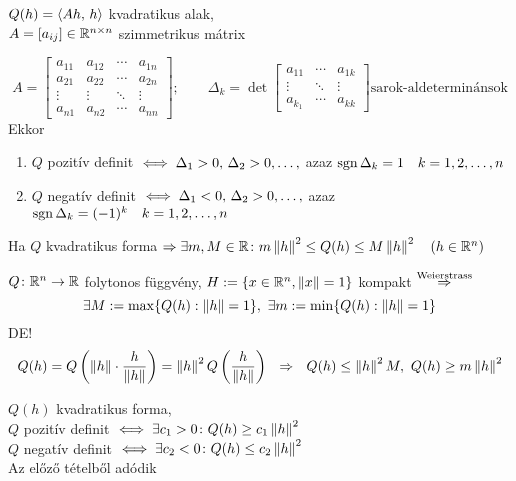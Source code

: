 \begin{te}$Q(h) = \langle Ah,\,h\rangle$ kvadratikus alak,\\$A=[a_{ij}]\in\mathbb{R}^{n\times n}$ szimmetrikus
  mátrix
  
  \[A=\begin{bmatrix}a_{11} & a_{12} & \cdots & a_{1n}\\
  a_{21} & a_{22} & \cdots & a_{2n}\\ \vdots & \vdots & \ddots & \vdots \\
  a_{n1} & a_{n2} & \cdots & a_{nn}\end{bmatrix};\qquad \Delta_k = \det\begin{bmatrix}a_{11}&\cdots&a_{1k}\\
  \vdots &\ddots& \vdots\\a_{k_1} & \cdots & a_{kk}\end{bmatrix} \text{sarok-aldeterminánsok}\]
Ekkor
\begin{enumerate}
\item $Q$ pozitív definit $\iff\Delta_1>0,\,\Delta_2>0,\dotsc,$ azaz $\operatorname{sgn}\Delta_k=1\quad k=1,2,\dotsc,n$
\item $Q$ negatív definit $\iff\Delta_1<0,\,\Delta_2>0,\dotsc,$ azaz $\operatorname{sgn}\Delta_k=(-1)^k \quad k=1,2,\dotsc,n$
\end{enumerate}
\end{te}

\begin{te}
  Ha $Q$ kvadratikus forma $\Rightarrow\\\exists m,M\in\mathbb{R}\colon m\left\Vert h\right\Vert^2\leq Q(h)\leq M\left\Vert h\right\Vert^2\quad(h\in\mathbb{R}^n)$
\end{te}
\begin{biz}
  $Q\colon \mathbb{R}^n\to\mathbb{R}$ folytonos függvény, $H:=\{x\in\mathbb{R}^n,\left\Vert x\right\Vert = 1\}$ kompakt $\stackrel{\text{Weierstrass}}{\Rightarrow}$\\
  \[\exists M:=\max\{Q(h) : \norma h = 1\},\ \exists m:=\min\{Q(h) : \norma h = 1\}\]
  DE!\\
  \[Q(h) =  Q\left(\norma{h}\cdot\dfrac{h}{\norma{h}}\right) = \norma{h}^2Q\left(\dfrac{h}{\norma{h}}\right)\ \ \nn\ 
  \ Q(h)\leq \norma{h}^2 M,\ Q(h)\geq m\norma{h}^2\]
\end{biz}

\begin{kov}
  $Q(h)$ kvadratikus forma,\\
  $Q$ pozitív definit $\iff \exists c_1>0\colon Q(h)\geq c_1\left\Vert h\right\Vert^2$\\
  $Q$ negatív definit $\iff \exists c_2<0\colon Q(h)\leq c_2\left\Vert h\right\Vert^2$\\
  Az előző tételből adódik
\end{kov}

